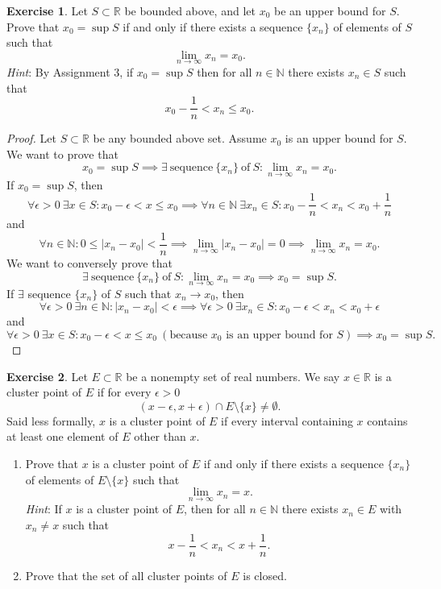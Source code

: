 \documentclass[12pt]{article}
\theoremstyle{definition}
\newtheorem{exercise}{Exercise}
\begin{document}
\begin{exercise}
    Let $S \subset \mathbb{R}$ be bounded above, and let $x_0$ be an upper bound for $S$. Prove that $x_0 = \sup S$ if and only if there exists a sequence $\{x_n\}$ of elements of $S$ such that
    \[
        \lim_{n \to \infty}x_n = x_0.
    \]
    \textit{Hint}: By Assignment 3, if $x_0 = \sup S$ then for all $n \in \mathbb{N}$ there exists $x_n \in S$ such that
    \[
        x_0 - \frac{1}{n} < x_n \leq x_0. 
    \]
\end{exercise}

\begin{proof}
    Let $S \subset \mathbb{R}$ be any bounded above set. Assume $x_0$ is an upper bound for $S$. We want to prove that 
    \[
        x_0 = \sup S \implies \exists \ \text{sequence} \ \{x_n\} \ \text{of} \ S : \lim_{n \to \infty}x_n = x_0.
    \]
    If $x_0 = \sup S$, then
    \[
        \forall \epsilon > 0 \ \exists x \in S : x_0 - \epsilon < x \leq x_0 \implies \forall n \in \mathbb{N} \ \exists x_n \in S : x_0 - \frac{1}{n} < x_n < x_0 + \frac{1}{n}
    \]
    and
    \[
        \forall n \in \mathbb{N} : 0 \leq \vert x_n - x_0 \vert < \frac{1}{n} \implies \lim_{n \to \infty}\vert x_n - x_0 \vert = 0 \implies \lim_{n \to \infty}x_n = x_0.
    \]
    We want to conversely prove that
    \[
        \exists \ \text{sequence} \ \{x_n\} \ \text{of} \ S : \lim_{n \to \infty}x_n = x_0 \implies x_0 = \sup S.
    \]
    If $\exists$ sequence $\{x_n\}$ of $S$ such that $x_n \to x_0$, then
    \[
        \forall \epsilon > 0 \ \exists n \in \mathbb{N} : \vert x_n - x_0 \vert < \epsilon \implies \forall \epsilon > 0 \ \exists x_n \in S : x_0 - \epsilon < x_n < x_0 + \epsilon
    \]
    and
    \[
        \forall \epsilon > 0 \ \exists x \in S : x_0 - \epsilon < x \leq x_0 \ (\text{because $x_0$ is an upper bound for $S$}) \implies x_0 = \sup S.
    \]
\end{proof}

\begin{exercise}
    Let $E \subset \mathbb{R}$ be a nonempty set of real numbers. We say $x \in \mathbb{R}$ is a cluster point of $E$ if for every $\epsilon > 0$
    \[
        (x - \epsilon, x + \epsilon) \cap E \setminus \{x\} \neq \emptyset.
    \]
    Said less formally, $x$ is a cluster point of $E$ if every interval containing $x$ contains at least one element of $E$ other than $x$.
    \begin{enumerate}[label=(\alph*)]
        \item Prove that $x$ is a cluster point of $E$ if and only if there exists a sequence $\{x_n\}$ of elements of $E \setminus \{x\}$ such that
        \[
            \lim_{n \to \infty}x_n = x.
        \]
        \textit{Hint}: If $x$ is a cluster point of $E$, then for all $n \in \mathbb{N}$ there exists $x_n \in E$ with $x_n \neq x$ such that
        \[
            x - \frac{1}{n} < x_n < x + \frac{1}{n}.
        \]
        \item Prove that the set of all cluster points of $E$ is closed.
    \end{enumerate}
\end{exercise}
\end{document}
